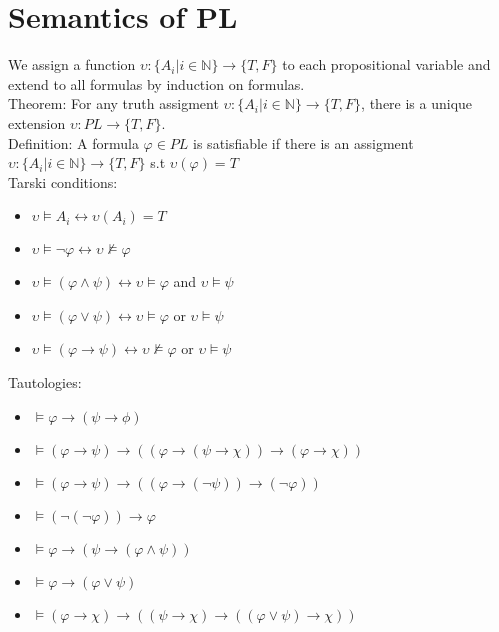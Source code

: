 \documentclass[10pt]{article}
\begin{document}
\section*{Semantics of PL}
We assign a function $\upsilon:\{A_i|i\in\mathbb{N}\}\rightarrow\{T,F\}$ to each propositional variable and extend to all formulas by induction on formulas.\\
Theorem: For any truth assigment $\upsilon:\{A_i|i\in\mathbb{N}\}\rightarrow\{T,F\}$, there is a unique extension $\upsilon:PL\rightarrow\{T,F\}$.\\
Definition: A formula $\varphi\in PL$ is satisfiable if there is an assigment $\upsilon:\{A_i|i\in\mathbb{N}\}\rightarrow\{T,F\}$ s.t $\upsilon(\varphi)=T$\\
Tarski conditions:
\begin{itemize}
    \item $\upsilon\models A_i\leftrightarrow \upsilon(A_i)=T$
    \item $\upsilon\models\lnot\varphi\leftrightarrow\upsilon\not\models\varphi$
    \item $\upsilon\models(\varphi\land\psi)\leftrightarrow\upsilon\models\varphi$ and $\upsilon\models\psi$
    \item $\upsilon\models(\varphi\lor\psi)\leftrightarrow\upsilon\models\varphi$ or $\upsilon\models\psi$
    \item $\upsilon\models(\varphi\rightarrow\psi)\leftrightarrow\upsilon\not\models\varphi$ or $\upsilon\models\psi$
\end{itemize}
Tautologies:
\begin{itemize}
    \item $\models\varphi\rightarrow(\psi\rightarrow\phi)$
    \item $\models(\varphi\rightarrow\psi)\rightarrow((\varphi\rightarrow(\psi\rightarrow\chi))\rightarrow(\varphi\rightarrow\chi))$
    \item $\models(\varphi\rightarrow\psi)\rightarrow((\varphi\rightarrow(\lnot\psi))\rightarrow(\lnot\varphi))$
    \item $\models(\lnot(\lnot\varphi))\rightarrow\varphi$
    \item $\models\varphi\rightarrow(\psi\rightarrow(\varphi\land\psi))$
    \item $\models\varphi\rightarrow(\varphi\lor\psi)$
    \item $\models(\varphi\rightarrow\chi)\rightarrow((\psi\rightarrow\chi)\rightarrow((\varphi\lor\psi)\rightarrow\chi))$
\end{itemize}
\end{document}
